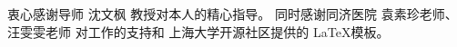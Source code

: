 \begin{acknowledgement}
  衷心感谢导师 沈文枫 教授对本人的精心指导。
  同时感谢同济医院 袁素珍老师、汪雯雯老师 对工作的支持和
  上海大学开源社区提供的 \LaTeX 模板。
\end{acknowledgement}

